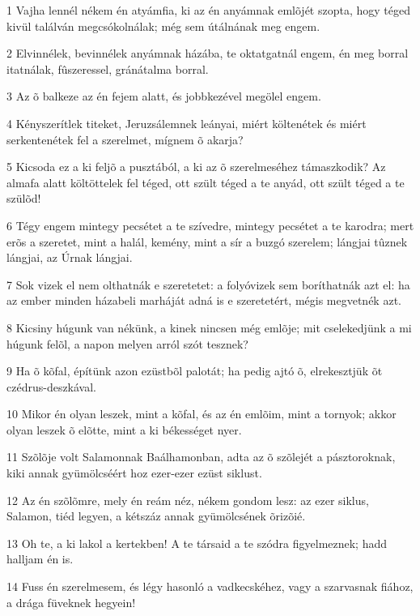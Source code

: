 \par 1 Vajha lennél nékem én atyámfia, ki az én anyámnak emlõjét szopta, hogy téged kivül találván megcsókolnálak; még sem útálnának meg engem.
\par 2 Elvinnélek, bevinnélek anyámnak házába, te oktatgatnál engem, én meg borral itatnálak, fûszeressel, gránátalma borral.
\par 3 Az õ balkeze az én fejem alatt, és jobbkezével megölel engem.
\par 4 Kényszerítlek titeket, Jeruzsálemnek leányai, miért költenétek és miért serkentenétek fel a szerelmet, mígnem õ akarja?
\par 5 Kicsoda ez a ki feljõ a pusztából, a ki az õ szerelmeséhez támaszkodik? Az almafa alatt költöttelek fel téged, ott szült téged a te anyád, ott szült téged a te szülõd!
\par 6 Tégy engem mintegy pecsétet a te szívedre, mintegy pecsétet a te karodra; mert erõs a szeretet, mint a halál, kemény, mint a sír a buzgó szerelem; lángjai tûznek lángjai, az Úrnak lángjai.
\par 7 Sok vizek el nem olthatnák e szeretetet: a folyóvizek sem boríthatnák azt el: ha az ember minden házabeli marháját adná is e szeretetért, mégis megvetnék azt.
\par 8 Kicsiny húgunk van nékünk, a kinek nincsen még emlõje; mit cselekedjünk a mi húgunk felõl, a napon melyen arról szót tesznek?
\par 9 Ha õ kõfal, építünk azon ezüstbõl palotát; ha pedig ajtó õ, elrekesztjük õt czédrus-deszkával.
\par 10 Mikor én olyan leszek, mint a kõfal, és az én emlõim, mint a tornyok; akkor olyan leszek õ elõtte, mint a ki békességet nyer.
\par 11 Szõlõje volt Salamonnak Baálhamonban, adta az õ szõlejét a pásztoroknak, kiki annak gyümölcséért hoz ezer-ezer ezüst siklust.
\par 12 Az én szõlõmre, mely én reám néz, nékem gondom lesz: az ezer siklus, Salamon, tiéd legyen, a kétszáz annak gyümölcsének õrizõié.
\par 13 Oh te, a ki lakol a kertekben! A te társaid a te szódra figyelmeznek; hadd halljam én is.
\par 14 Fuss én szerelmesem, és légy hasonló a vadkecskéhez, vagy a szarvasnak fiához, a drága füveknek hegyein!


